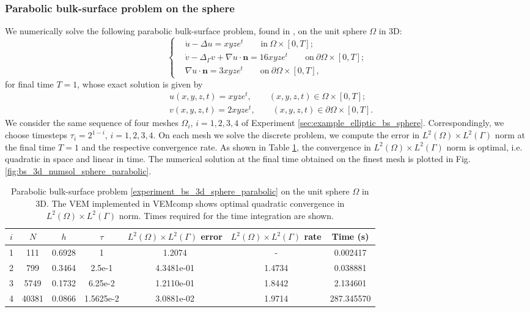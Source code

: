 \documentclass[a4paper]{article}
\newcommand{\boldn}{\boldsymbol{n}}
\begin{document}
\subsubsection{Parabolic bulk-surface problem on the sphere}
\label{sec:example_parabolic_bs_sphere}
We numerically solve the following parabolic bulk-surface problem,  found in \cite{frittelli2021bulk}, on the unit sphere $\Omega$ in 3D:
\begin{equation}
\label{experiment_bs_3d_sphere_parabolic}
\begin{cases}
&\dot{u} -\Delta u  = xyze^t \qquad  \text{in}\ \Omega \times [0,T];\\
&\dot{v} -\Delta_\Gamma v +\nabla u\cdot\boldn = 16xyze^t \qquad \text{on}\ \partial \Omega \times [0,T];\\
&\nabla u \cdot \boldn = 3xyze^t  \qquad \text{on}\ \partial \Omega \times [0,T],
\end{cases}
\end{equation}
for final time $T=1$, whose exact solution is given by
\begin{align*}
&u(x,y,z,t) = xyze^t, \qquad (x,y,z,t) \in \Omega \times [0,T];\\
&v(x,y,z,t) = 2xyze^t, \qquad (x,y,z,t) \in \partial\Omega \times [0,T].
\end{align*}
We consider the same sequence of four meshes $\Omega_i$, $i=1,2,3,4$ of Experiment \ref{sec:example_elliptic_bs_sphere}.  Correspondingly, we choose timesteps $\tau_i = 2^{1-i}$,  $i=1,2,3,4$. On each mesh we solve the discrete problem,  we compute the error in $L^2(\Omega)\times L^2(\Gamma)$ norm at the final time $T=1$ and the respective convergence rate. As shown in Table \ref{tab:bs_3d_convergence_sphere_parabolic}, the convergence in $L^2(\Omega)\times L^2(\Gamma)$ norm is optimal, i.e. quadratic in space and linear in time. The numerical solution at the final time obtained on the finest mesh is plotted in Fig.  \ref{fig:bs_3d_numsol_sphere_parabolic}.

\begin{table}[H]
\caption{Parabolic bulk-surface problem \eqref{experiment_bs_3d_sphere_parabolic} on the unit sphere $\Omega$ in 3D. The VEM implemented in VEMcomp shows optimal quadratic convergence in $L^2(\Omega) \times L^2(\Gamma)$ norm. Times required for the time integration are shown.}
\begin{center}
\begin{tabular}{c | c | c | c | c | c | c}
$i$ & $N$ & $h$ & $\tau$ & $L^2(\Omega)\times L^2(\Gamma)$ error & $L^2(\Omega)\times L^2(\Gamma)$ rate & Time (s)\\
\hline
1 & 111 & 0.6928 &   1 & 1.2074 &  -   & 0.002417\\
2 & 799 & 0.3464 & 2.5e-1 & 4.3481e-01 & 1.4734    & 0.038881\\
3 & 5749 & 0.1732 & 6.25e-2 & 1.2110e-01 & 1.8442  & 2.134601  \\
4 & 40381 & 0.0866 &  1.5625e-2 & 3.0881e-02 & 1.9714 & 287.345570
\end{tabular}
\end{center}
\label{tab:bs_3d_convergence_sphere_parabolic}
\end{table}
\end{document}
